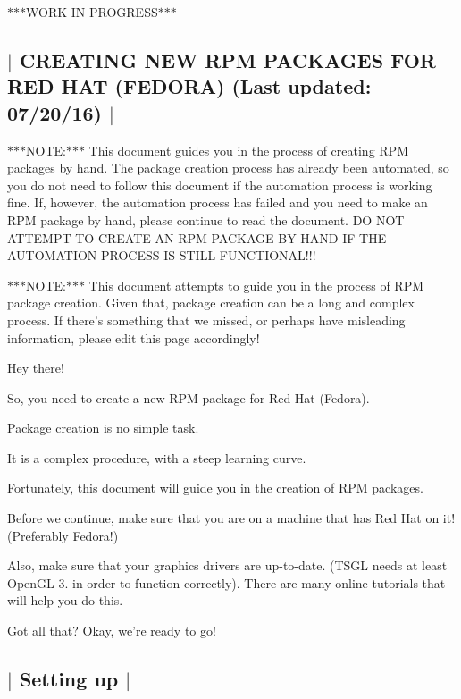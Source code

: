 $\ast$$\ast$$\ast$\-W\-O\-R\-K I\-N P\-R\-O\-G\-R\-E\-S\-S$\ast$$\ast$$\ast$ 

 \subsection*{$\vert$ C\-R\-E\-A\-T\-I\-N\-G N\-E\-W R\-P\-M P\-A\-C\-K\-A\-G\-E\-S F\-O\-R R\-E\-D H\-A\-T (F\-E\-D\-O\-R\-A) (Last updated\-: 07/20/16) $\vert$ }

$\ast$$\ast$$\ast$\-N\-O\-T\-E\-:$\ast$$\ast$$\ast$ This document guides you in the process of creating R\-P\-M packages by hand. The package creation process has already been automated, so you do not need to follow this document if the automation process is working fine. If, however, the automation process has failed and you need to make an R\-P\-M package by hand, please continue to read the document. D\-O N\-O\-T A\-T\-T\-E\-M\-P\-T T\-O C\-R\-E\-A\-T\-E A\-N R\-P\-M P\-A\-C\-K\-A\-G\-E B\-Y H\-A\-N\-D I\-F T\-H\-E A\-U\-T\-O\-M\-A\-T\-I\-O\-N P\-R\-O\-C\-E\-S\-S I\-S S\-T\-I\-L\-L F\-U\-N\-C\-T\-I\-O\-N\-A\-L!!!

$\ast$$\ast$$\ast$\-N\-O\-T\-E\-:$\ast$$\ast$$\ast$ This document attempts to guide you in the process of R\-P\-M package creation. Given that, package creation can be a long and complex process. If there's something that we missed, or perhaps have misleading information, please edit this page accordingly!

Hey there!

So, you need to create a new R\-P\-M package for Red Hat (Fedora).

Package creation is no simple task.

It is a complex procedure, with a steep learning curve.

Fortunately, this document will guide you in the creation of R\-P\-M packages.

Before we continue, make sure that you are on a machine that has Red Hat on it! (Preferably Fedora!)

Also, make sure that your graphics drivers are up-\/to-\/date. (T\-S\-G\-L needs at least Open\-G\-L 3. in order to function correctly). There are many online tutorials that will help you do this.

Got all that? Okay, we're ready to go! 

 \subsection*{$\vert$ Setting up $\vert$ }

